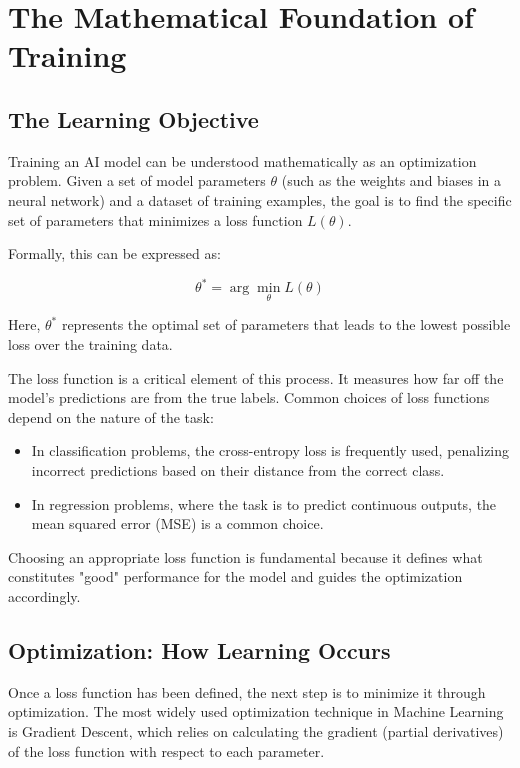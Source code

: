 \documentclass[openany]{book}
\begin{document}
\section{The Mathematical Foundation of Training}

\subsection{The Learning Objective}

Training an AI model can be understood mathematically as an optimization 
problem. Given a set of model parameters $\theta$ (such as the weights and 
biases in a neural network) and a dataset of training examples, the goal is to 
find the specific set of parameters that minimizes a loss function $L(\theta)$.

Formally, this can be expressed as:

\begin{equation}
\theta^* = \arg\min_{\theta} L(\theta)
\end{equation}

Here, $\theta^*$ represents the optimal set of parameters that leads to the 
lowest possible loss over the training data.

The loss function is a critical element of this process. It measures how far 
off the model's predictions are from the true labels. Common choices of loss 
functions depend on the nature of the task:

\begin{itemize}
    \item In classification problems, the cross-entropy loss is frequently used,
     penalizing incorrect predictions based on their distance from the correct 
     class.
    \item In regression problems, where the task is to predict continuous 
    outputs, the mean squared error (MSE) is a common choice.
\end{itemize}

Choosing an appropriate loss function is fundamental because it defines what 
constitutes "good" performance for the model and guides the optimization 
accordingly.

\subsection{Optimization: How Learning Occurs}

Once a loss function has been defined, the next step is to minimize it through 
optimization. The most widely used optimization technique in Machine Learning 
is Gradient Descent, which relies on calculating the gradient 
(partial derivatives) of the loss function with respect to each parameter.
\end{document}

